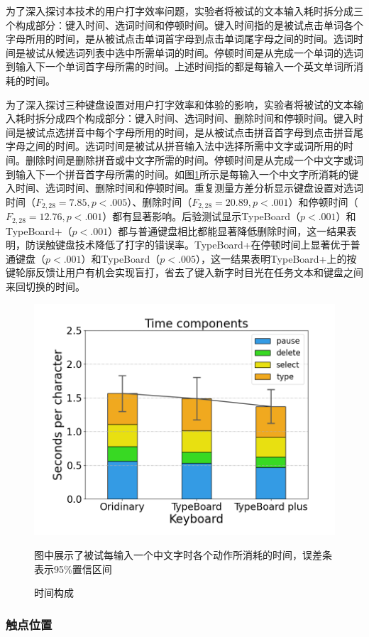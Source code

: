 为了深入探讨本技术的用户打字效率问题，实验者将被试的文本输入耗时拆分成三个构成部分：键入时间、选词时间和停顿时间。键入时间指的是被试点击单词各个字母所用的时间，是从被试点击单词首字母到点击单词尾字母之间的时间。选词时间是被试从候选词列表中选中所需单词的时间。停顿时间是从完成一个单词的选词到输入下一个单词首字母所需的时间。上述时间指的都是每输入一个英文单词所消耗的时间。

为了深入探讨三种键盘设置对用户打字效率和体验的影响，实验者将被试的文本输入耗时拆分成四个构成部分：键入时间、选词时间、删除时间和停顿时间。键入时间是被试点选拼音中每个字母所用的时间，是从被试点击拼音首字母到点击拼音尾字母之间的时间。选词时间是被试从拼音输入法中选择所需中文字或词所用的时间。删除时间是删除拼音或中文字所需的时间。停顿时间是从完成一个中文字或词到输入下一个拼音首字母所需的时间。如图\ref{fig:TypeBoard_time_components}所示是每输入一个中文字所消耗的键入时间、选词时间、删除时间和停顿时间。重复测量方差分析显示键盘设置对选词时间（$F_{2,28}=7.85,p<.005$）、删除时间（$F_{2,28}=20.89,p<.001$）和停顿时间（$F_{2,28}=12.76,p<.001$）都有显著影响。后验测试显示TypeBoard（$p<.001$）和TypeBoard+（$p<.001$）都与普通键盘相比都能显著降低删除时间，这一结果表明，防误触键盘技术降低了打字的错误率。TypeBoard+在停顿时间上显著优于普通键盘（$p<.001$）和TypeBoard（$p<.005$），这一结果表明TypeBoard+上的按键轮廓反馈让用户有机会实现盲打，省去了键入新字时目光在任务文本和键盘之间来回切换的时间。

\begin{figure}[!tbh]
	\includegraphics[width=0.7\linewidth]{figures/TypeBoard_time_components.png}
	\centering
	\caption*{图中展示了被试每输入一个中文字时各个动作所消耗的时间，误差条表示95\%置信区间}
	\caption{时间构成}
	\label{fig:TypeBoard_time_components}
\end{figure}

\subsubsection{触点位置}

